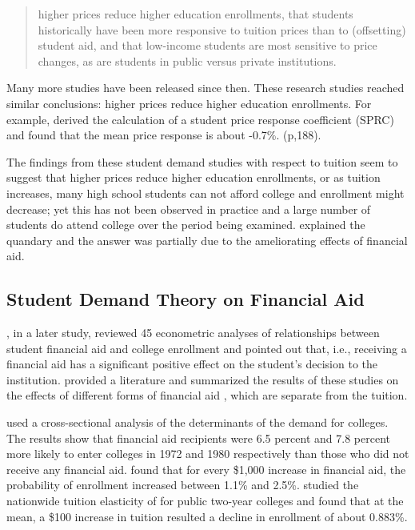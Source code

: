 \documentclass[12pt,english]{report}
\begin{document}
\blockquote{higher prices reduce higher education enrollments, that students historically have been more responsive to tuition prices than to (offsetting) student aid, and that low-income students are most sensitive to price changes, as are students in public versus private institutions.}

Many more studies have been released since then. These research 
studies reached similar conclusions: higher prices reduce higher education enrollments.  For example, \citet{Leslie1987} derived the calculation of a student price response coefficient (SPRC) and 
found that the mean price response is about -0.7\%.   (p,188).

The findings from these student demand studies with respect to tuition seem to suggest that higher prices reduce higher education enrollments, or as tuition increases, many high school students can not afford college and enrollment might decrease; yet this has not been observed in practice and a large number of students do attend college over the period being examined. \citet{Leslie1987} explained the quandary and the answer was partially due to the ameliorating effects of financial aid. 

\subsection{Student Demand Theory on Financial Aid}
\citet{Leslie1988}, in a later study, reviewed 45 econometric analyses of relationships 
between student financial aid and college enrollment and pointed out that, i.e., receiving a financial aid has a significant positive effect on the student's decision to the institution.  \citet{Heller1997} provided a literature and summarized the results of these studies on the effects of different forms of financial aid , which are separate from the tuition. 

\citet{JACKSON198815} used a cross-sectional analysis of the determinants of the demand for colleges.  The results show that financial aid recipients were 6.5 percent and 7.8 percent more likely to enter colleges in 1972 and 1980 respectively than those who did not receive any financial aid. \citet{Braunstein1999} found that for every \$1,000 increase in financial aid, the probability of enrollment increased between 1.1\% and 2.5\%. \citet{Crouse2015} studied the nationwide tuition elasticity of for public two-year colleges and found that at the mean, a \$100 increase in tuition resulted a decline in enrollment of about 0.883\%.
\end{document}
